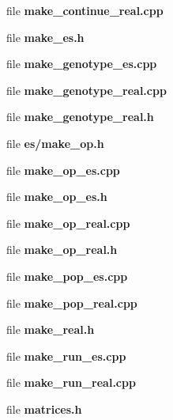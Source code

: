 \begin{CompactItemize}
\item 
file {\bf make_continue_real.cpp}
\item 
file {\bf make_es.h}
\item 
file {\bf make_genotype_es.cpp}
\item 
file {\bf make_genotype_real.cpp}
\item 
file {\bf make_genotype_real.h}
\item 
file {\bf es/make_op.h}
\item 
file {\bf make_op_es.cpp}
\item 
file {\bf make_op_es.h}
\item 
file {\bf make_op_real.cpp}
\item 
file {\bf make_op_real.h}
\item 
file {\bf make_pop_es.cpp}
\item 
file {\bf make_pop_real.cpp}
\item 
file {\bf make_real.h}
\item 
file {\bf make_run_es.cpp}
\item 
file {\bf make_run_real.cpp}
\item 
file {\bf matrices.h}
\end{CompactItemize}
